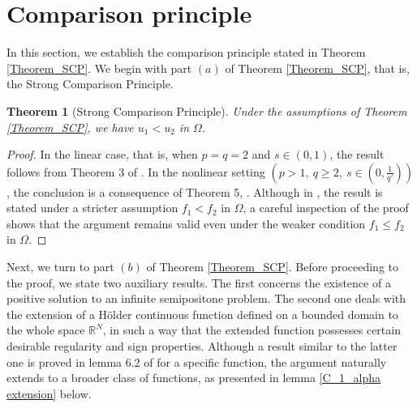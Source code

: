 \documentclass[reqno,oneside]{amsart}
\newtheorem{theorem}{Theorem}[section]
\theoremstyle{definition}
\theoremstyle{remark}
\numberwithin{equation}{section}
\newcommand{\Om} {\Omega}
\newcommand{\sr}{\mathbb{R}}
\begin{document}

\section{Comparison principle}\label{section_Hopf_type_SCP}

In this section, we establish the comparison principle stated in Theorem \ref{Theorem_SCP}. We begin with part $(a)$ of Theorem \ref{Theorem_SCP}, that is, the Strong Comparison Principle.

\begin{theorem}[Strong Comparison Principle]\label{Theorem_only_scp}
    Under the assumptions of Theorem \ref{Theorem_SCP}, we have $u_1<u_2$ in $\Om$.
\end{theorem}

\begin{proof}
    In the linear case, that is, when $p=q=2$ and $s\in (0,1)$, the result follows from Theorem 3 of \cite{pramanik2024mixed}. In the nonlinear setting $\left( p>1,\ q\geq 2,\ s\in \left( 0, \frac{1}{q'} \right) \right)$, the conclusion is a consequence of Theorem 5, \cite{dhanya2026regularity}. Although in \cite{dhanya2026regularity}, the result is stated under a stricter assumption $f_1 < f_2$ in $\Om$, a careful inspection of the proof shows that the argument remains valid even under the weaker condition $f_1 \leq f_2$ in $\Om$.
\end{proof}

Next, we turn to part $(b)$ of Theorem \ref{Theorem_SCP}. Before proceeding to the proof, we state two auxiliary results. The first concerns the existence of a positive solution to an infinite semipositone problem. The second one deals with the extension of a H\"older continuous function defined on a bounded domain to the whole space $\sr^N$, in such a way that the extended function possesses certain desirable regularity and sign properties. Although a result similar to the latter one is proved in lemma 6.2 of \cite{pramanik2024mixed} for a specific function, the argument naturally extends to a broader class of functions, as presented in lemma \ref{C_1_alpha extension} below.
\end{document}
